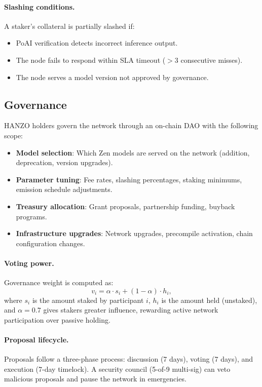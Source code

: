 \documentclass[11pt]{article}
\begin{document}
\paragraph{Slashing conditions.} A staker's collateral is partially slashed if:
\begin{itemize}[leftmargin=1.1em]
    \item PoAI verification detects incorrect inference output.
    \item The node fails to respond within SLA timeout ($>$3 consecutive misses).
    \item The node serves a model version not approved by governance.
\end{itemize}

\subsection{Governance}
\label{sec:governance}

HANZO holders govern the network through an on-chain DAO with the following
scope:

\begin{itemize}[leftmargin=1.1em]
    \item \textbf{Model selection}: Which Zen models are served on the network
    (addition, deprecation, version upgrades).
    \item \textbf{Parameter tuning}: Fee rates, slashing percentages, staking
    minimums, emission schedule adjustments.
    \item \textbf{Treasury allocation}: Grant proposals, partnership funding,
    buyback programs.
    \item \textbf{Infrastructure upgrades}: Network upgrades, precompile
    activation, chain configuration changes.
\end{itemize}

\paragraph{Voting power.} Governance weight is computed as:
\begin{equation}
v_i = \alpha \cdot s_i + (1 - \alpha) \cdot h_i,
\end{equation}
where $s_i$ is the amount staked by participant $i$, $h_i$ is the amount held
(unstaked), and $\alpha = 0.7$ gives stakers greater influence, rewarding active
network participation over passive holding.

\paragraph{Proposal lifecycle.} Proposals follow a three-phase process:
discussion (7 days), voting (7 days), and execution (7-day timelock). A security
council (5-of-9 multi-sig) can veto malicious proposals and pause the network in
emergencies.
\end{document}
